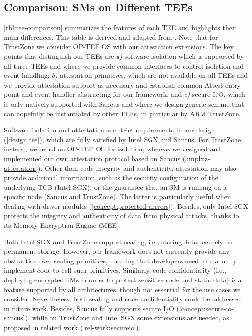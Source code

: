 

\subsection{Comparison: SMs on Different TEEs}
\label{impl:comparison}

\cref{tbl:tee-comparison} summarizes the features of each \ac{TEE} and
highlights their main differences. This table is derived and adapted from
\cite{maene:hardware}. Note that for TrustZone we consider OP-TEE OS with our
attestation extensions.
The key points that distinguish our \acp{TEE} are \emph{a)} software isolation
which is supported by all three \acp{TEE} and where we provide common
interfaces to control isolation and event handling;
\emph{b)} attestation primitives, which are not available on all \acp{TEE} and we 
provide attestation support as necessary and establish common Attest entry
point and event handler abstracting for our framework; and \emph{c)}
secure I/O, which is only natively supported with Sancus and where we
design generic scheme that can hopefully be instantiated by other
\acp{TEE}, in particular by ARM TrustZone.

Software isolation and attestation are strict requirements in our design
(\cref{design:tee}), which are fully satisfied by Intel \ac{SGX} and Sancus. For
TrustZone, instead, we relied on OP-TEE OS for isolation, whereas we designed
and implemented our own attestation protocol based on Sancus
(\cref{impl:tz-attestation}). Other than code integrity and authenticity,
attestation may also provide additional information, such as the security
configuration of the underlying TCB (Intel \ac{SGX}), or the guarantee that an
\ac{SM} is running on a specific node (Sancus and TrustZone). The latter is
particularly useful when dealing with driver modules
(\cref{concept:protected-drivers}). Besides, only Intel \ac{SGX} protects the
integrity and authenticity of data from physical attacks, thanks to its Memory
Encryption Engine (MEE).

Both Intel \ac{SGX} and TrustZone support sealing, i.e., storing data securely
on permanent storage. However, our framework does not currently provide any
abstraction over sealing primitives, meaning that developers need to manually
implement code to call such primitives. Similarly, code confidentiality (i.e.,
deploying encrypted \acp{SM} in order to protect sensitive code and static data)
is a feature supported by all architectures, though not essential for the use
cases we consider. Nevertheless, both sealing and code confidentiality could be
addressed in future work. Besides, Sancus fully supports secure I/O
(\cref{concept:secure-io-sancus}), while on TrustZone and Intel \ac{SGX} some
extensions are needed, as proposed in related work (\cref{rel-work:secureio}).

